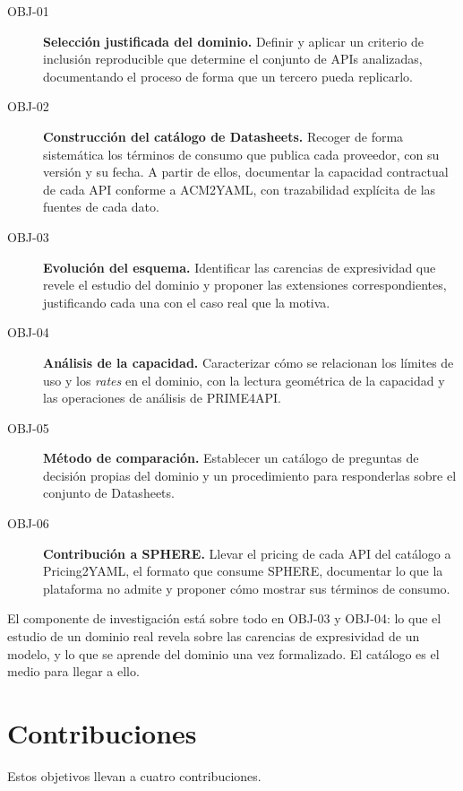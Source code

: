 \begin{description}
  \item[OBJ-01] \textbf{Selección justificada del dominio.} Definir y
    aplicar un criterio de inclusión reproducible que determine el conjunto
    de APIs analizadas, documentando el proceso de forma que un tercero
    pueda replicarlo.
  \item[OBJ-02] \textbf{Construcción del catálogo de Datasheets.} Recoger
    de forma sistemática los términos de consumo que publica cada
    proveedor, con su versión y su fecha. A partir de ellos, documentar la
    capacidad contractual de cada API conforme a ACM2YAML, con trazabilidad
    explícita de las fuentes de cada dato.
  \item[OBJ-03] \textbf{Evolución del esquema.} Identificar las carencias
    de expresividad que revele el estudio del dominio y proponer las extensiones
    correspondientes, justificando cada una con el caso real que la motiva.
  \item[OBJ-04] \textbf{Análisis de la capacidad.} Caracterizar cómo se
    relacionan los límites de uso y los \textit{rates} en el dominio, con la
    lectura geométrica de la capacidad y las operaciones de análisis de
    PRIME4API.
  \item[OBJ-05] \textbf{Método de comparación.} Establecer un catálogo de
    preguntas de decisión propias del dominio y un procedimiento para
    responderlas sobre el conjunto de Datasheets.
  \item[OBJ-06] \textbf{Contribución a SPHERE.} Llevar el pricing de cada
    API del catálogo a Pricing2YAML, el formato que consume SPHERE,
    documentar lo que la plataforma no admite y proponer cómo mostrar sus
    términos de consumo.
\end{description}

El componente de investigación está sobre todo en OBJ-03 y OBJ-04: lo que el
estudio de un dominio real revela sobre las carencias de expresividad de un
modelo, y lo que se aprende del dominio una vez formalizado. El catálogo es el
medio para llegar a ello.

\section{Contribuciones}
\label{sec:introduccion:contribuciones}

Estos objetivos llevan a cuatro contribuciones.


